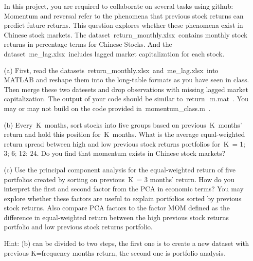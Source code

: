 \documentclass{article}
\begin{document}
In this project, you are required to collaborate on several tasks using github: Momentum and reversal refer to the phenomena that previous stock returns can predict future returns. This question explores whether these phenomena exist in Chinese stock markets. The dataset return_monthly.xlsx contains monthly stock returns in percentage terms for Chinese Stocks. And the dataset me_lag.xlsx includes lagged market capitalization for each stock.

(a) First, read the datasets return_monthly.xlsx and me_lag.xlsx into MATLAB and reshape them into the long-table formats as you have seen in class. Then merge these two datesets and drop observations with missing lagged market capitalization. The output of your code should be similar to return_m.mat . You may or may not build on the code provided in momentum_class.m .

(b) Every K months, sort stocks into five groups based on previous K months' return and hold this position for K months. What is the average equal-weighted return spread between high and low previous stock returns portfolios for K = 1; 3; 6; 12; 24. Do you find that momentum exists in Chinese stock markets?

(c) Use the principal component analysis for the equal-weighted return of five portfolios created by sorting on previous K = 3 months' return. How do you interpret the first and second factor from the PCA in economic terms? You may explore whether these factors are useful to explain portfolios sorted by previous stock returns. Also compare PCA factors to the factor MOM defined as the difference in equal-weighted return between the high previous stock returns portfolio and low previous stock returns portfolio.

Hint: (b) can be divided to two steps, the first one is to create a new dataset with previous K=frequency months return, the second one is portfolio analysis.
\end{document}

